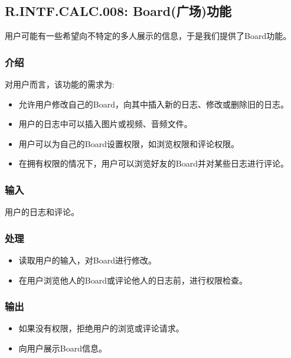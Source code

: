 \subsection{R.INTF.CALC.008: Board(广场)功能}
用户可能有一些希望向不特定的多人展示的信息，于是我们提供了Board功能。
\subsubsection{介绍}
对用户而言，该功能的需求为:
\begin{itemize}
  \item 允许用户修改自己的Board，向其中插入新的日志、修改或删除旧的日志。
  \item 用户的日志中可以插入图片或视频、音频文件。
  \item 用户可以为自己的Board设置权限，如浏览权限和评论权限。
  \item 在拥有权限的情况下，用户可以浏览好友的Board并对某些日志进行评论。
\end{itemize}
\subsubsection{输入}
用户的日志和评论。
\subsubsection{处理}
\begin{itemize}
  \item 读取用户的输入，对Board进行修改。
  \item 在用户浏览他人的Board或评论他人的日志前，进行权限检查。
\end{itemize}
\subsubsection{输出}
\begin{itemize}
  \item 如果没有权限，拒绝用户的浏览或评论请求。
  \item 向用户展示Board信息。
\end{itemize}


